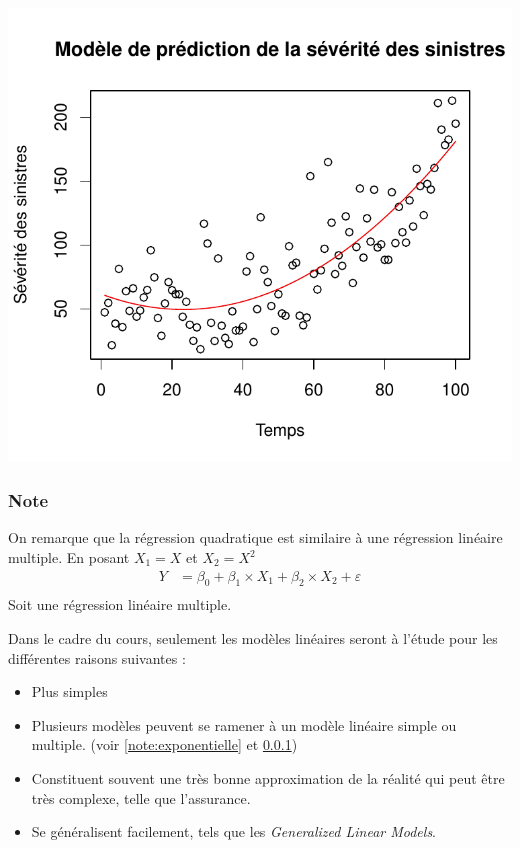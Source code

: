 \documentclass[11pt,french]{report}
\begin{document}
\includegraphics{notes_de_cours-004}

\subsubsection{Note}
\label{note:quadratique}
On remarque que la régression quadratique est similaire à une régression linéaire multiple. En posant $X_1=X$ et $X_2 = X^2$
\begin{align*}
Y &= \beta_0 + \beta_1 \times X_1 + \beta_2 \times X_2 + \varepsilon\\
\end{align*}
Soit une régression linéaire multiple.\newline

Dans le cadre du cours, seulement les modèles linéaires seront à l'étude pour les différentes raisons suivantes :

\bigskip
\begin{itemize}
\item Plus simples
\item Plusieurs modèles peuvent se ramener à un modèle linéaire simple ou multiple. (voir \ref{note:exponentielle} et \ref{note:quadratique})
\item Constituent souvent une très bonne approximation de la réalité qui peut être très complexe, telle que l'assurance.
\item Se généralisent facilement, tels que les \textit{Generalized Linear Models}.
\end{itemize}
\bigskip
\end{document}
